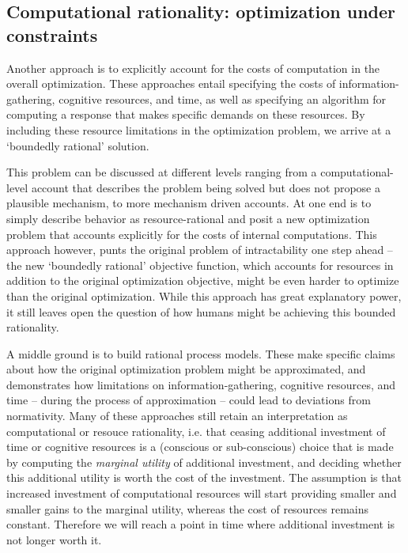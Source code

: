 \subsection{Computational rationality: optimization under constraints}

Another approach is to explicitly account for the costs of computation in the overall optimization. 
These approaches entail specifying the costs of information-gathering, cognitive resources, and time, as well as specifying an algorithm for computing a response that makes specific demands on these resources. By including these resource limitations in the optimization problem, we arrive at a `boundedly rational' solution.

This problem can be discussed at different levels ranging from a computational-level account that describes the problem being solved but does not propose a plausible mechanism, to more mechanism driven accounts. At one end is to simply describe behavior as resource-rational \citep{Vul2014, schulz2016simple} and posit a new optimization problem that accounts explicitly for the costs of internal computations. This approach however, punts the original problem of intractability one step ahead -- the new `boundedly rational' objective function, which accounts for resources in addition to the original optimization objective, might be even harder to optimize than the original optimization. While this approach has great explanatory power, it still leaves open the question of how humans might be achieving this bounded rationality.

A middle ground is to build rational process models\citep{griffiths2015, sanborn2010rational, dasgupta17}. These make specific claims about how the original optimization problem might be approximated, and demonstrates how limitations on information-gathering, cognitive resources, and time -- during the process of approximation -- could lead to deviations from normativity. Many of these approaches still retain an interpretation as computational or resouce rationality, i.e. that ceasing additional investment of time or cognitive resources is a (conscious or sub-conscious) choice that is made by computing the \textit{marginal utility} of additional investment, and deciding whether this additional utility is worth the cost of the investment\cite{gershman15, griffiths2015}. The assumption is that increased investment of computational resources will start providing smaller and smaller gains to the marginal utility, whereas the cost of resources remains constant. Therefore we will reach a point in time where additional investment is not longer worth it.

